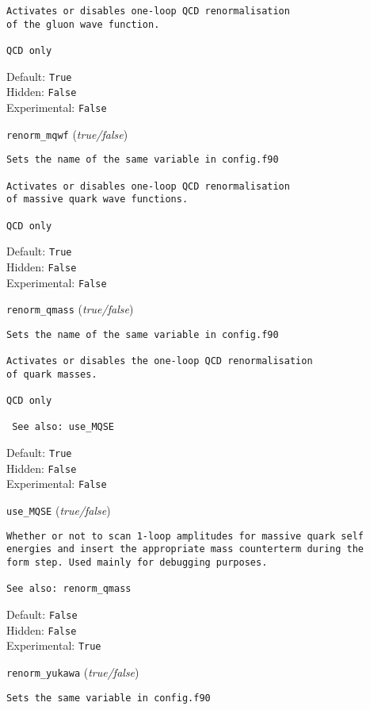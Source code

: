 \begin{basedescript}{\desclabelstyle{\pushlabel}}
\begin{verbatim}
Activates or disables one-loop QCD renormalisation
of the gluon wave function.

QCD only
\end{verbatim}
Default: \verb|True|
\\Hidden: \verb|False|
\\Experimental: \verb|False|
\\\item[\colorbox{gray!30}{\texttt{renorm\_mqwf}}] (\textit{true/false})
\begin{verbatim}
Sets the name of the same variable in config.f90

Activates or disables one-loop QCD renormalisation
of massive quark wave functions.

QCD only
\end{verbatim}
Default: \verb|True|
\\Hidden: \verb|False|
\\Experimental: \verb|False|
\\\item[\colorbox{gray!30}{\texttt{renorm\_qmass}}] (\textit{true/false})
\begin{verbatim}
Sets the name of the same variable in config.f90

Activates or disables the one-loop QCD renormalisation
of quark masses.

QCD only

 See also: use_MQSE
\end{verbatim}
Default: \verb|True|
\\Hidden: \verb|False|
\\Experimental: \verb|False|
\\\item[\colorbox{gray!30}{\texttt{use\_MQSE}}] (\textit{true/false})
\begin{verbatim}
Whether or not to scan 1-loop amplitudes for massive quark self
energies and insert the appropriate mass counterterm during the
form step. Used mainly for debugging purposes.

See also: renorm_qmass
\end{verbatim}
Default: \verb|False|
\\Hidden: \verb|False|
\\Experimental: \verb|True|
\\\item[\colorbox{gray!30}{\texttt{renorm\_yukawa}}] (\textit{true/false})
\begin{verbatim}
Sets the same variable in config.f90


\end{verbatim}
\end{basedescript}
